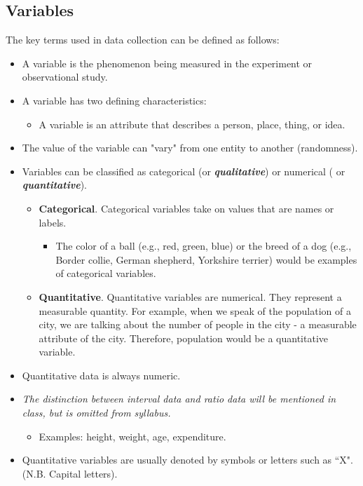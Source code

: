\documentclass[a4paper,12pt]{article}
\begin{document}
\subsection*{Variables}
The key terms used in data collection can be deﬁned as follows:
\begin{itemize}
\item A variable is the phenomenon being measured in the experiment or observational
	study.
\item A variable has two defining characteristics:
     \begin{itemize}
	\item A variable is an attribute that describes a person, place, thing, or idea. 
\end{itemize}
\item	The value of the variable can "vary" from one entity to another (randomness). 
\item Variables can be classified as categorical (or \textbf{\textit{qualitative}}) or numerical ( or \textbf{\textit{quantitative}}). 
\begin{itemize}
	\item	\textbf{Categorical}. Categorical variables take on values that are names or labels. 
	\begin{itemize}
		\item The color of a ball (e.g., red, green, blue) or the breed of a dog (e.g., Border collie, German shepherd, Yorkshire terrier) would be examples of categorical variables.
	\end{itemize} 
	\item	\textbf{Quantitative}. Quantitative variables are numerical. They represent a measurable quantity. For example, when we speak of the population of a city, we are talking about the number of people in the city - a measurable attribute of the city. Therefore, population would be a quantitative variable. 
\end{itemize}
\item Quantitative data is always
	numeric.
\item \textit{The distinction between interval data and ratio data will be mentioned in class, but is omitted from syllabus.}
\begin{itemize}
	\item Examples: height, weight, age, expenditure.
\end{itemize}
        \item Quantitative variables are usually denoted by symbols or letters such as ``X". (N.B. Capital letters).
 \end{itemize}
 
\end{document}
